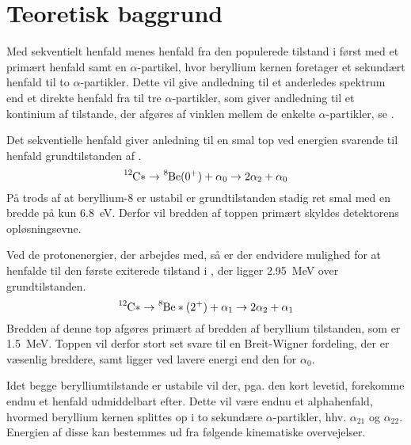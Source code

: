 \section{Teoretisk baggrund}
\label{sec:sekventiel-teo}

Med sekventielt henfald menes henfald fra den populerede tilstand i \Carb først med et primært
henfald \Be samt en $\alpha$-partikel, hvor beryllium kernen foretager et sekundært henfald til to
$\alpha$-partikler. Dette vil give andledning til et anderledes spektrum end et direkte henfald fra \Carb
til tre $\alpha$-partikler, som giver andledning til et kontinium af tilstande, der afgøres af vinklen
mellem de enkelte $\alpha$-partikler, se \cite{Becker}.

Det sekventielle henfald giver anledning til en smal top ved energien svarende til henfald
grundtilstanden af \Be.
\begin{equation}
  \label{eq:alpha0}
  \Carb* \rightarrow \Be(0^{+}) + \alpha_{0} \rightarrow 2\alpha_{2} + \alpha_{0}
\end{equation}
På trods af at beryllium-8 er ustabil er grundtilstanden stadig ret smal med en bredde på kun
\SI{6.8}{\eV}. Derfor vil bredden af toppen primært skyldes detektorens opløsningsevne. 

Ved de protonenergier, der arbejdes med, så er der endvidere mulighed for at henfalde til den første
exiterede tilstand i \Be, der ligger \SI{2.95}{\MeV} over grundtilstanden.
\begin{equation}
  \label{eq:alpha0}
  \Carb* \rightarrow \Be*(2^{+}) + \alpha_{1} \rightarrow 2\alpha_{2} + \alpha_{1}
\end{equation}
Bredden af denne top afgøres primært af bredden af beryllium tilstanden, som er
\SI{1.5}{\MeV}. Toppen vil derfor stort set svare til en Breit-Wigner fordeling, der er væsenlig
breddere, samt ligger ved lavere energi end den for $\alpha_{0}$.

Idet begge berylliumtilstande er ustabile vil der, pga. den kort levetid, forekomme endnu et henfald
udmiddelbart efter. Dette vil være endnu et alphahenfald, hvormed beryllium kernen splittes op i to
sekundære $\alpha$-partikler, hhv. $\alpha_{21}$ og $\alpha_{22}$. Energien af disse kan bestemmes ud fra følgende
kinematiske overvejelser.